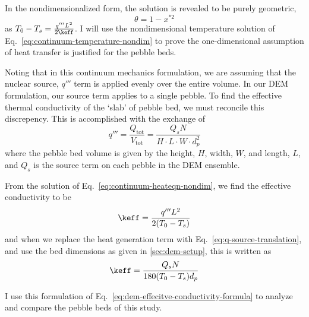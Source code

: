 In the nondimensionalized form, the solution is revealed to be purely geometric,
\begin{equation}\label{eq:continuum-temperature-nondim}
	\theta = 1-x^{*2}
\end{equation}
as $T_0  - T_s = \frac{q'''L^2}{2\keff}$. I will use the nondimensional temperature solution of Eq.~\ref{eq:continuum-temperature-nondim} to prove the one-dimensional assumption of heat transfer is justified for the pebble beds.

Noting that in this continuum mechanics formulation, we are assuming that the nuclear source, $q'''$ term is applied evenly over the entire volume. In our DEM formulation, our source term applies to a single pebble. To find the effective thermal conductivity of the `slab' of pebble bed, we must reconcile this discrepency. This is accomplished with the exchange of
\begin{equation}\label{eq:q-source-translation}
	q''' = \frac{Q_\text{tot}}{V_\text{tot}} = \frac{Q_sN}{H\cdot L\cdot W\cdot d_p^2}
\end{equation}
where the pebble bed volume is given by the height, $H$, width, $W$, and length, $L$, and $Q_s$ is the source term on each pebble in the DEM ensemble. 

From the solution of Eq.~\ref{eq:continuum-heateqn-nondim}, we find the effective conductivity to be
\begin{equation}
	\keff = \frac{q''' L^2}{2(T_0-T_s)}
\end{equation}
and when we replace the heat generation term with Eq.~\ref{eq:q-source-translation}, and use the bed dimensions as given in \cref{sec:dem-setup}, this is written as
\begin{equation}\label{eq:dem-effecitve-conductivity-formula}
	\keff = \frac{Q_sN}{180(T_0-T_s)d_p}
\end{equation}

I use this formulation of Eq.~\ref{eq:dem-effecitve-conductivity-formula} to analyze and compare the pebble beds of this study.



